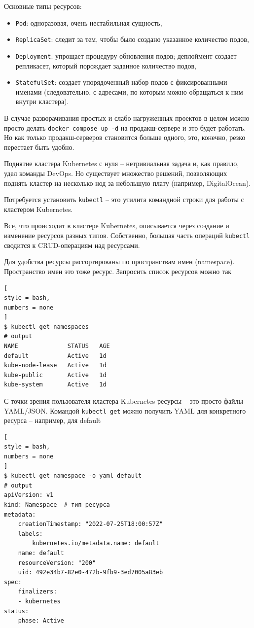 \documentclass[%
	11pt,
	a4paper,
	utf8,
		]{article}
\begin{document}
Основные типы ресурсов:
\begin{itemize}
	\item \verb*|Pod|: одноразовая, очень нестабильная сущность,
	
	\item \verb*|ReplicaSet|: следит за тем, чтобы было создано указанное количество подов,
	
	\item \verb*|Deployment|: упрощает процедуру обновления подов; деплоймент создает репликасет, который порождает заданное количество подов,
	
	\item \verb*|StatefulSet|: создает упорядоченный набор подов с фиксированными именами (следовательно, с адресами, по которым можно обращаться к ним внутри кластера).
\end{itemize}

В случае разворачивания простых и слабо нагруженных проектов в целом можно просто делать \verb|docker compose up -d| на продакш-сервере и это будет работать. Но как только продакш-серверов становится больше одного, это, конечно, резко перестает быть удобно.

Поднятие кластера Kubernetes с нуля -- нетривиальная задача и, как правило, удел команды DevOps. Но существует множество решений, позволяющих поднять кластер на несколько нод за небольшую плату (например, DigitalOcean). 

Потребуется установить \verb*|kubectl| -- это утилита командной строки для работы с кластером Kubernetes.

Все, что происходит в кластере Kubernetes, описывается через создание и изменение ресурсов разных типов. Собственно, большая часть операций \verb*|kubectl| сводится к CRUD-операциям над ресурсами.

Для удобства ресурсы рассортированы по пространствам имен (namespace). Пространство имен это тоже ресурс. Запросить список ресурсов можно так
\begin{lstlisting}[
style = bash,
numbers = none
]
$ kubectl get namespaces
# output
NAME              STATUS   AGE
default           Active   1d
kube-node-lease   Active   1d
kube-public       Active   1d
kube-system       Active   1d
\end{lstlisting}

С точки зрения пользователя кластера Kubernetes ресурсы -- это просто файлы YAML/JSON. Командой \verb|kubectl get| можно получить YAML для конкретного ресурса -- например, для default
\begin{lstlisting}[
style = bash,
numbers = none
]
$ kubectl get namespace -o yaml default
# output
apiVersion: v1
kind: Namespace  # тип ресурса
metadata:
	creationTimestamp: "2022-07-25T18:00:57Z"
	labels:
		kubernetes.io/metadata.name: default
	name: default
	resourceVersion: "200"
	uid: 492e34b7-82e0-472b-9fb9-3ed7005a83eb
spec:
	finalizers:
	- kubernetes
status:
	phase: Active
\end{lstlisting}
\end{document}
